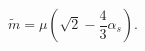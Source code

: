 \begin{equation}                              
\tilde{m}= \mu (\sqrt{2} - \frac{4}{3} \alpha_{s}).                           \label{eq:con}      
\end{equation} 
